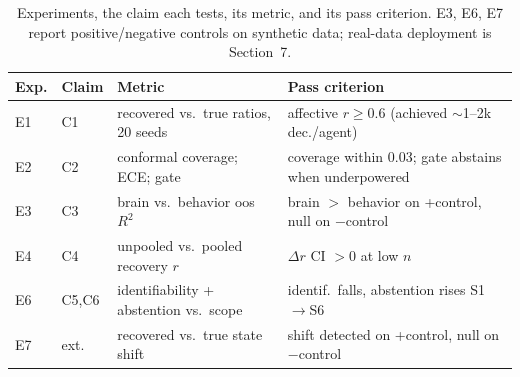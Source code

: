\begin{table}[t]
\centering
\caption{Experiments, the claim each tests, its metric, and its pass criterion. E3, E6, E7 report positive/negative controls on synthetic data; real-data deployment is Section~7.}
\label{tab:experiments}
\begin{tabular}{llp{3.2cm}p{4.2cm}}
\toprule
Exp. & Claim & Metric & Pass criterion \\
\midrule
E1 & C1 & recovered vs.\ true ratios, 20 seeds & affective $r \ge 0.6$ (achieved $\sim$1--2k dec./agent) \\
E2 & C2 & conformal coverage; ECE; gate & coverage within 0.03; gate abstains when underpowered \\
E3 & C3 & brain vs.\ behavior oos $R^2$ & brain $>$ behavior on +control, null on $-$control \\
E4 & C4 & unpooled vs.\ pooled recovery $r$ & $\Delta r$ CI $> 0$ at low $n$ \\
E6 & C5,C6 & identifiability + abstention vs.\ scope & identif.\ falls, abstention rises S1$\to$S6 \\
E7 & ext. & recovered vs.\ true state shift & shift detected on +control, null on $-$control \\
\bottomrule
\end{tabular}
\end{table}

